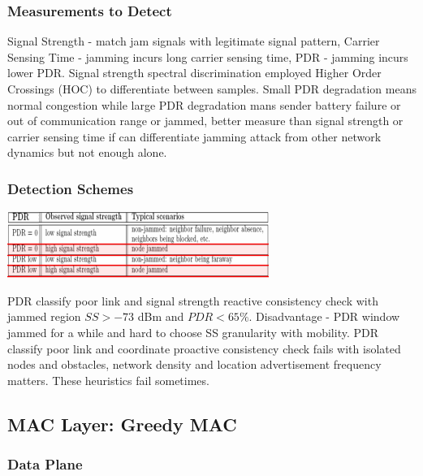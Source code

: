 \documentclass[9pt]{extarticle}
\begin{document}
\begin{multicols}{2}
\subsubsection{Measurements to Detect}

Signal Strength - match jam signals with legitimate signal pattern, Carrier Sensing Time - jamming incurs long carrier sensing time, PDR - jamming incurs lower PDR. Signal strength spectral discrimination employed Higher Order Crossings (HOC) to differentiate between samples. Small PDR degradation means normal congestion while large PDR degradation mans sender battery failure or out of communication range or jammed, better measure than signal strength or carrier sensing time if can differentiate jamming attack from other network dynamics but not enough alone.

\subsubsection{Detection Schemes}

\includegraphics{pdrss.png}

PDR classify poor link and signal strength reactive consistency check with jammed region $SS>-73$ dBm and $PDR<65\%$. Disadvantage - PDR window jammed for a while and hard to choose SS granularity with mobility. PDR classify poor link and coordinate proactive consistency check fails with isolated nodes and obstacles, network density and location advertisement frequency matters. These heuristics fail sometimes.

\subsection{MAC Layer: Greedy MAC}

\subsubsection{Data Plane}


\end{multicols}
\end{document}
